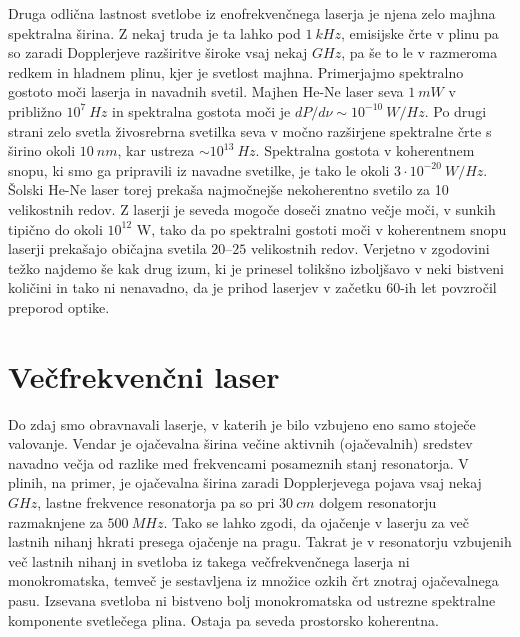 Druga odlična lastnost svetlobe iz enofrekvenčnega laserja je njena zelo majhna
spektralna širina. Z nekaj truda je ta lahko pod $1~\si{kHz}$, emisijske 
črte v plinu pa so zaradi Dopplerjeve razširitve široke vsaj nekaj $\si{GHz}$, 
pa še to le v razmeroma redkem in hladnem plinu, kjer je svetlost majhna.
Primerjajmo spektralno gostoto moči laserja in navadnih svetil. Majhen He-Ne
laser seva $1~\si{mW}$ v približno $10^{7}~\si{Hz}$ in spektralna gostota
moči je $dP/d\nu \sim 10^{-10}~\si{W/Hz}$. Po drugi strani zelo svetla 
živosrebrna svetilka seva v močno razširjene spektralne črte s širino okoli 
$10~\si{nm}$, kar ustreza $\sim 10^{13}~\si{Hz}$. 
Spektralna gostota v koherentnem snopu, ki smo ga pripravili iz
navadne svetilke, je tako le okoli $3\cdot 10^{-20}~\si{W/Hz}$. Šolski
He-Ne laser torej prekaša najmočnejše nekoherentno svetilo za 10
velikostnih redov. Z laserji je seveda mogoče doseči znatno večje
moči, v sunkih tipično do okoli $10^{12}$ W, tako da po spektralni gostoti moči v
koherentnem snopu laserji prekašajo običajna svetila $20$--$25$
velikostnih redov. Verjetno v zgodovini težko najdemo še kak drug izum, 
ki je prinesel tolikšno izboljšavo v neki bistveni količini in tako ni 
nenavadno, da je prihod laserjev v začetku 60-ih let povzročil preporod optike.

\section{Večfrekvenčni laser}
Do zdaj smo obravnavali laserje, v katerih je bilo vzbujeno eno samo stoječe
valovanje. Vendar je ojačevalna širina večine aktivnih (ojačevalnih) sredstev 
navadno večja od razlike med frekvencami posameznih 
stanj resonatorja. V plinih, na primer, je ojačevalna širina zaradi 
Dopplerjevega pojava vsaj nekaj $\si{GHz}$, lastne frekvence resonatorja 
pa so pri $30~\si{cm}$ dolgem resonatorju razmaknjene za $500~\si{MHz}$. 
Tako se lahko zgodi, da ojačenje v laserju za več lastnih nihanj hkrati 
presega ojačenje na pragu. Takrat je v resonatorju vzbujenih več lastnih nihanj in 
svetloba iz takega večfrekvenčnega laserja ni monokromatska,
temveč je sestavljena iz množice ozkih črt znotraj ojačevalnega pasu.
Izsevana svetloba ni bistveno bolj monokromatska od ustrezne spektralne 
komponente svetlečega plina. Ostaja pa seveda prostorsko koherentna.

